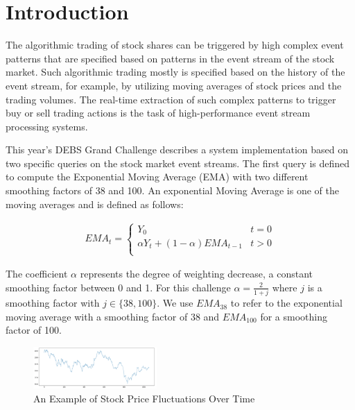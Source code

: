 
\section{Introduction}
The algorithmic trading of stock shares can be triggered by high complex event patterns that are specified
based on patterns in the event stream of the stock market. Such algorithmic trading mostly is specified
based on the history of the event stream, for example, by utilizing moving averages of stock prices and the trading volumes.
The real-time extraction of such complex patterns to trigger buy or sell trading actions is the task
of high-performance event stream processing systems.

This year's DEBS Grand Challenge \cite{debs2022challenge} describes a system implementation based on two specific queries on the
stock market event streams. The first query is defined to compute the Exponential Moving Average (EMA) with two
different smoothing factors of 38 and 100.
An exponential Moving Average is one of the moving averages and is defined as follows:

\begin{align*}
    EMA_t = \begin{cases}
        Y_0 &  t = 0 \\
        \alpha Y_t + (1-\alpha) EMA_{t-1}& t>0 \\
        \end{cases}
\end{align*}

The coefficient $\alpha$ represents the degree of weighting decrease, a constant smoothing factor between 0 and 1.
For this challenge $\alpha = \frac{2}{1+j}$ where $j$ is a smoothing factor with $j \in \{38, 100 \}$.
We use $EMA_{38}$ to refer to the exponential moving average with a smoothing factor of 38
and $EMA_{100}$ for a smoothing factor of 100.


\begin{figure}[!ht]
    \begin{center}
        \includegraphics[width=0.42\textwidth]{./images/stock_example.png}
        \caption{An Example of Stock Price Fluctuations Over Time}
        \label{fig:stock}
    \end{center}
\end{figure}



